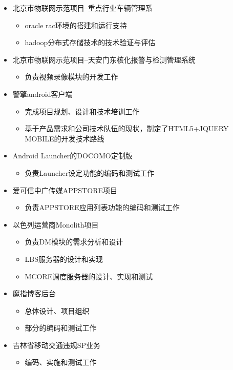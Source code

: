 \documentclass{resume}
\begin{document}
\begin{itemize}
  \item 北京市物联网示范项目--重点行业车辆管理系
  \begin{itemize}
    \item oracle rac环境的搭建和运行支持
    \item hadoop分布式存储技术的技术验证与评估
  \end{itemize}
  \item 北京市物联网示范项目--天安门东核化报警与检测管理系统
  \begin{itemize}
    \item 负责视频录像模块的开发工作
  \end{itemize}
  \item 警擎android客户端
  \begin{itemize}
    \item 完成项目规划、设计和技术培训工作
    \item 基于产品需求和公司技术队伍的现状，制定了HTML5+JQUERY MOBILE的开发技术路线
  \end{itemize}
\end{itemize}

\begin{itemize}
  \item Android Launcher的DOCOMO定制版
  \begin{itemize}
    \item 负责Launcher设定功能的编码和测试工作
  \end{itemize}
  \item 爱可信中广传媒APPSTORE项目
  \begin{itemize}
    \item 负责APPSTORE应用列表功能的编码和测试工作
  \end{itemize}
  \item 以色列运营商Monolith项目
  \begin{itemize}
    \item 负责DM模块的需求分析和设计
    \item LBS服务器的设计和实现
    \item MCORE调度服务器的设计、实现和测试
  \end{itemize}
\end{itemize}

\begin{itemize}
  \item 魔指博客后台
  \begin{itemize}
    \item 总体设计、项目组织
    \item 部分的编码和测试工作
  \end{itemize}
  \item 吉林省移动交通违规SP业务
  \begin{itemize}
    \item 编码、实施和测试工作
  \end{itemize}
\end{itemize}
\end{document}

